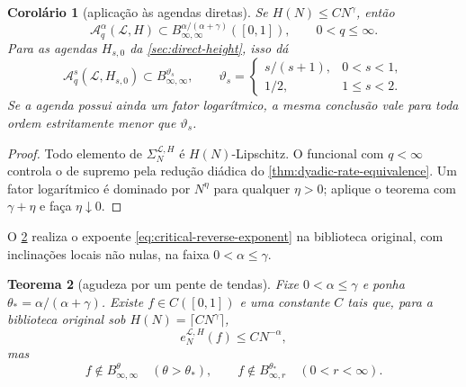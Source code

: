 \documentclass[11pt,a4paper]{article}
\newtheorem{theorem}{Teorema}[section]
\newtheorem{corollary}[theorem]{Corolário}
\theoremstyle{definition}
\theoremstyle{remark}
\newcommand{\Library}{\mathcal{L}}
\begin{document}
\begin{corollary}[aplicação às agendas diretas]
\label{cor:raw-library-inverse}
Se $H(N)\le C N^\gamma$, então
\begin{equation}
 \mathscr A_q^\alpha(\Library,H)
 \subset B^{\alpha/(\alpha+\gamma)}_{\infty,\infty}([0,1]),
 \qquad 0<q\le\infty.
 \label{eq:raw-library-inverse}
\end{equation}
Para as agendas $H_{s,0}$ da \cref{sec:direct-height}, isso dá
\begin{equation}
 \mathscr A_q^s(\Library,H_{s,0})
 \subset B^{\vartheta_s}_{\infty,\infty},
 \qquad
 \vartheta_s=
 \begin{cases}
 s/(s+1),&0<s<1,\\
 1/2,&1\le s<2.
 \end{cases}
 \label{eq:corrected-schedule-raw-inverse}
\end{equation}
Se a agenda possui ainda um fator logarítmico, a mesma conclusão vale para
toda ordem estritamente menor que $\vartheta_s$.
\end{corollary}

\begin{proof}
Todo elemento de $\Sigma_N^{\Library,H}$ é $H(N)$-Lipschitz. O funcional com
$q<\infty$ controla o de supremo pela redução diádica do
\cref{thm:dyadic-rate-equivalence}. Um fator logarítmico é dominado por
$N^\eta$ para qualquer $\eta>0$; aplique o teorema com
$\gamma+\eta$ e faça $\eta\downarrow0$.
\end{proof}

O \cref{thm:critical-tent-comb} realiza o expoente \eqref{eq:critical-reverse-exponent} na biblioteca original, com inclinações locais não nulas, na faixa $0<\alpha\le\gamma$.

\begin{theorem}[agudeza por um pente de tendas]
\label{thm:critical-tent-comb}
Fixe $0<\alpha\le\gamma$ e ponha
$\theta_*=\alpha/(\alpha+\gamma)$. Existe
$f\in C([0,1])$ e uma constante $C$ tais que, para a biblioteca original sob
$H(N)=\lceil CN^\gamma\rceil$,
\begin{equation}
 e_N^{\Library,H}(f)\le CN^{-\alpha},
 \label{eq:comb-approximation-rate}
\end{equation}
mas
\begin{equation}
 f\notin B^\theta_{\infty,\infty}\quad(\theta>\theta_*),
 \qquad
 f\notin B^{\theta_*}_{\infty,r}\quad(0<r<\infty).
 \label{eq:comb-sharpness}
\end{equation}
\end{theorem}
\end{document}
